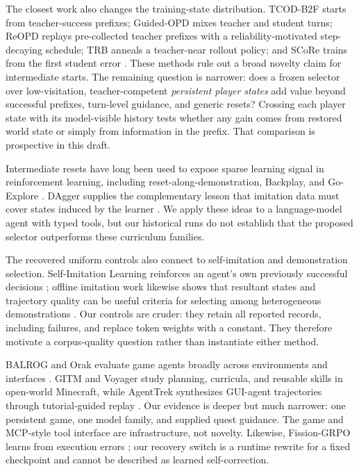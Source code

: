 \documentclass[11pt,a4paper]{article}
\begin{document}
The closest work also changes the training-state distribution. TCOD-B2F starts
from teacher-success prefixes; Guided-OPD mixes teacher and student turns; ReOPD
replays pre-collected teacher prefixes with a reliability-motivated step-decaying
schedule; TRB anneals a teacher-near rollout policy; and SCoRe
trains from the first student error
\citep{wang2026tcod,li2026guidedopd,liao2026reopd,plyusov2026trb,lyu2025score}.
These methods rule out a broad novelty claim for intermediate starts. The
remaining question is narrower: does a frozen selector over low-visitation,
teacher-competent \emph{persistent player states} add value beyond successful
prefixes, turn-level guidance, and generic resets? Crossing each player state
with its model-visible history tests whether any gain comes from restored world
state or simply from information in the prefix. That comparison is prospective
in this draft.

Intermediate resets have long been used to expose sparse learning signal in
reinforcement learning, including reset-along-demonstration, Backplay, and
Go-Explore
\citep{salimans2018montezuma,resnick2018backplay,ecoffet2021goexplore}.
DAgger supplies the complementary lesson that imitation data must cover states
induced by the learner \citep{ross2011dagger}. We apply these ideas to a
language-model agent with typed tools, but our historical runs do not establish
that the proposed selector outperforms these curriculum families.

The recovered uniform controls also connect to self-imitation and
demonstration selection. Self-Imitation Learning reinforces an agent's own
previously successful decisions \citep{oh2018selfimitation}; offline imitation
work likewise shows that resultant states and trajectory quality can be useful
criteria for selecting among heterogeneous demonstrations
\citep{yue2024diverse}. Our controls are cruder: they retain all reported
records, including failures, and replace token weights with a constant. They
therefore motivate a corpus-quality question rather than instantiate either
method.

BALROG and Orak evaluate game agents broadly across environments and interfaces
\citep{paglieri2025balrog,park2025orak}. GITM and Voyager study planning,
curricula, and reusable skills in open-world Minecraft, while AgentTrek
synthesizes GUI-agent trajectories through tutorial-guided replay
\citep{zhu2023gitm,wang2023voyager,zheng2025agenttrek}. Our evidence is deeper
but much narrower: one persistent game, one model family, and supplied quest
guidance. The game and MCP-style tool interface are infrastructure, not novelty.
Likewise, Fission-GRPO learns from execution errors
\citep{zhang2026fission}; our recovery switch is a runtime rewrite for a fixed
checkpoint and cannot be described as learned self-correction.
\end{document}
